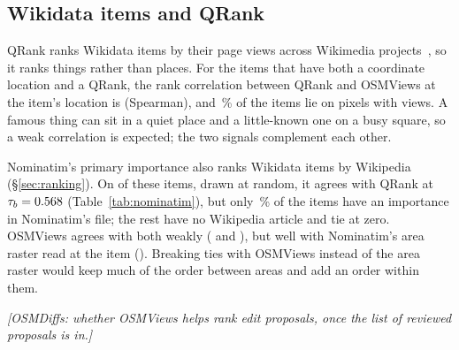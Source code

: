 \documentclass[10pt,twocolumn]{article}
\newcommand{\todo}[1]{{\color{red!60!black}\itshape[#1]}}
\begin{document}
\begin{table}[t]
  \centering\small
  \caption{Ranking \resRankingCitiesCities{} cities by each function summed
    within \resRankingCitiesRadiusKm\,km: agreement (Kendall's $\tau_b$)
    with the population in GeoNames and with OSMViews.}
  \label{tab:cities}
  
\end{table}

\subsection{Wikidata items and QRank}
QRank ranks Wikidata items by their page views across Wikimedia
projects~\cite{qrank}, so it ranks things rather than places. For the
\resQrankItems{} items that have both a coordinate location and a QRank,
the rank correlation between QRank and OSMViews at the item's location is
\resQrankSpearman{} (Spearman), and \resQrankWithViewsPct\,\% of the items
lie on pixels with views. A famous thing can sit in a quiet place and a
little-known one on a busy square, so a weak correlation is expected; the
two signals complement each other.

Nominatim's primary importance also ranks Wikidata items by Wikipedia
(\S\ref{sec:ranking}). On \resNominatimItems{} of these items, drawn at
random, it agrees with QRank at $\tau_b = 0.568$
(Table~\ref{tab:nominatim}), but only \resNominatimWithImportancePct\,\%
of the items have an importance in Nominatim's file; the rest have no
Wikipedia article and tie at zero. OSMViews agrees with both weakly
(\resNominatimQrankOsmviews{} and \resNominatimImportanceOsmviews), but
well with Nominatim's area raster read at the item
(\resNominatimOsmviewsSecondary). Breaking ties with OSMViews instead of the area raster
would keep much of the order between areas and add an order within them.

\begin{table}[t]
  \centering\small
  \caption{Agreement (Kendall's $\tau_b$) between rankings of
    \resNominatimItems{} Wikidata items with coordinates: QRank, Nominatim's
    primary importance, OSMViews at the item, and Nominatim's area
    raster at the item (Area).}
  \label{tab:nominatim}
  
\end{table}
\todo{OSMDiffs: whether OSMViews helps rank edit proposals, once the list of
reviewed proposals is in.}

\begin{table}[t]
  \centering\small
  \caption{Share of points, in percent, that each function cannot tell
    apart from another point of the same sample set.}
  \label{tab:ties}
  
\end{table}
\end{document}
